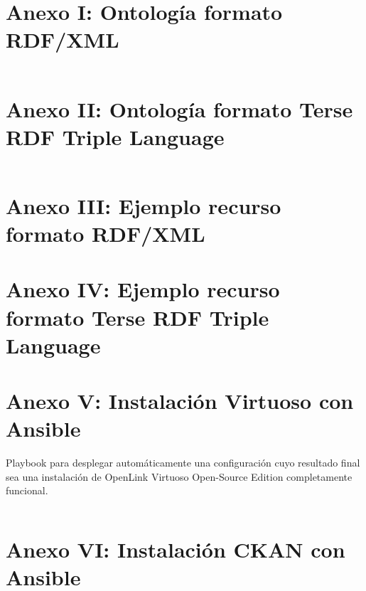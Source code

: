 \chapter*{Anexo I: Ontología formato RDF/XML}

\label{anexo_i}
\inputminted[tabsize=2,breaklines]{xml}{../../data/converted/rdf/ugr.rdf}

\chapter*{Anexo II: Ontología formato Terse RDF Triple Language}
\label{anexo_ii}
\inputminted[tabsize=2,breaklines]{text}{../../data/converted/ttl/ugr.ttl}

\chapter*{Anexo III: Ejemplo recurso formato RDF/XML}

\chapter*{Anexo IV: Ejemplo recurso formato Terse RDF Triple Language}

\chapter*{Anexo V: Instalación Virtuoso con Ansible}

{\sf Playbook} para desplegar automáticamente una configuración cuyo resultado final sea una instalación de {\sf OpenLink Virtuoso Open-Source Edition} completamente funcional.

\label{anexo_v}
\inputminted[tabsize=2,breaklines]{yaml}{../../ansible/virtuoso.yml}

\chapter*{Anexo VI: Instalación CKAN con Ansible}
